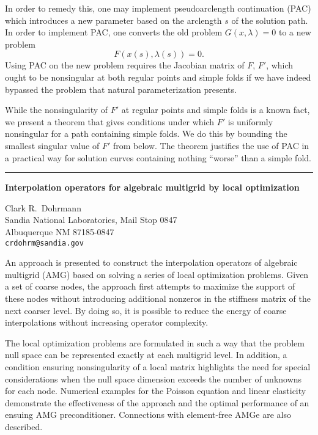 \documentclass[twosided]{report}
\begin{document}
In order to remedy this,
one may implement pseudoarclength continuation (PAC) which
introduces a new parameter based on the arclength $s$ of the
solution path. In order to implement PAC, one converts the
old problem $G(x,\lambda)=0$ to a new problem
\[F(x(s),\lambda(s))=0.\]
Using PAC on the new problem
requires the Jacobian matrix of $F$, $F'$, which ought to be
nonsingular at both regular points and simple folds if we
have indeed bypassed the problem that natural
parameterization presents.

While the nonsingularity of $F'$
at regular points and simple folds is a known fact, we
present a theorem that gives conditions under which $F'$ is
uniformly nonsingular for a path containing simple folds. We
do this by bounding the smallest singular value of $F'$ from
below. The theorem justifies the use of PAC in a practical
way for solution curves containing nothing ``worse'' than a
simple fold.



	\begin{center} \rule{6in}{1pt} \end{center}

\begin{center}
{\large			%
{\bf Interpolation operators for algebraic multigrid by local optimization}}

	Clark R.~Dohrmann \\
	Sandia National Laboratories, Mail Stop 0847 \\
	Albuquerque NM 87185-0847 \\
	{\tt crdohrm@sandia.gov}
\end{center}
An approach is presented to construct the interpolation
operators of algebraic multigrid (AMG) based on solving a
series of local optimization problems. Given a set of coarse
nodes, the approach first attempts to maximize the support
of these nodes without introducing additional nonzeros in
the stiffness matrix of the next coarser level. By doing so,
it is possible to reduce the energy of coarse interpolations
without increasing operator complexity.

The local
optimization problems are formulated in such a way that the
problem null space can be represented exactly at each
multigrid level. In addition, a condition ensuring
nonsingularity of a local matrix highlights the need for
special considerations when the null space dimension exceeds
the number of unknowns for each node. Numerical examples for
the Poisson equation and linear elasticity demonstrate the
effectiveness of the approach and the optimal performance of
an ensuing AMG preconditioner. Connections with element-free
AMGe are also described.
\end{document}
